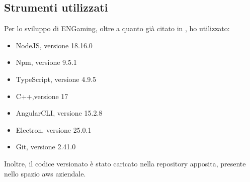 \subsection{Strumenti utilizzati}
Per lo sviluppo di ENGaming, oltre a quanto già citato in , ho utilizzato:

\begin{itemize}
    \item NodeJS, versione 18.16.0
    \item Npm, versione 9.5.1
    \item TypeScript, versione 4.9.5
    \item C++,versione 17
    \item AngularCLI, versione 15.2.8
    \item Electron, versione 25.0.1
    \item Git, versione 2.41.0
\end{itemize}
Inoltre, il codice versionato è stato caricato nella repository apposita, presente nello spazio \gls{aws} aziendale.
